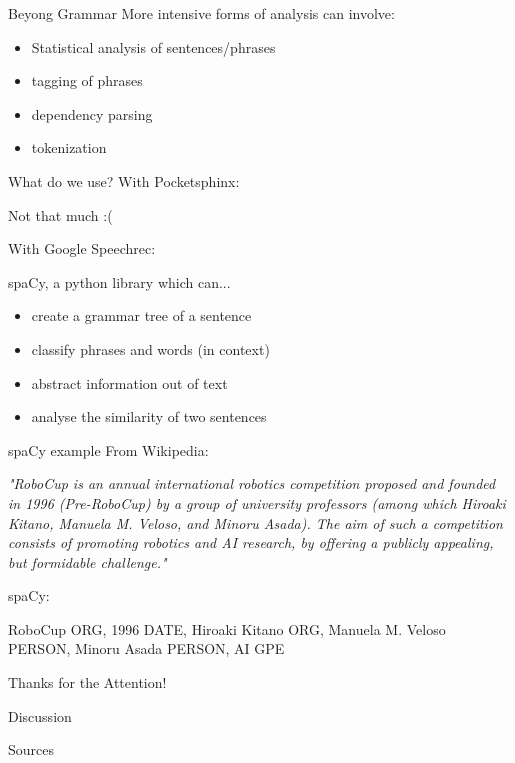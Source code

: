 \documentclass{beamer}
\begin{document}
	\begin{frame}{Beyong Grammar}
		More intensive forms of analysis can involve:
		\begin{itemize}
			\item Statistical analysis of sentences/phrases
			\item tagging of phrases
			\item dependency parsing
			\item tokenization
		\end{itemize} 
	\end{frame}
	
	\begin{frame}{What do we use?}
		With Pocketsphinx: 
		
		\pause
		Not that much :(
		
		With Google Speechrec:
		
		\pause
		spaCy, a python library which can...
		\begin{itemize}
			\item create a grammar tree of a sentence
			\item classify phrases and words (in context)
			\item abstract information out of text
			\item analyse the similarity of two sentences
		\end{itemize}
	\end{frame}
	
	\begin{frame}{spaCy example}
		From Wikipedia:
		
		\emph{"RoboCup is an annual international robotics competition proposed and founded in 1996 (Pre-RoboCup) by a group of university professors (among which Hiroaki Kitano, Manuela M. Veloso, and Minoru Asada). The aim of such a competition consists of promoting robotics and AI research, by offering a publicly appealing, but formidable challenge."}
		\pause
		
		spaCy:
		
		RoboCup ORG,
		1996 DATE,
		Hiroaki Kitano ORG,
		Manuela M. Veloso PERSON,
		Minoru Asada PERSON,
		AI GPE
	\end{frame}
	
	\begin{frame}{}
		Thanks for the Attention!
	\end{frame}
	
	\begin{frame}{}
		Discussion
	\end{frame}
	
	
	\begin{frame}{Sources}
		
		
	\end{frame}
	
\end{document}
